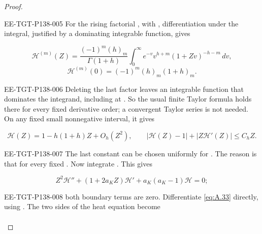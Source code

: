 \begin{proof}
\begin{EESegment}{EE-TGT-P138-005}
For the rising factorial , with
, differentiation under the integral, justified by a dominating integrable function,
gives
\end{EESegment}
\begin{equation}
 \mathcal H^{(m)}(Z)=\frac{(-1)^m(h)_m}{\Gamma(1+h)}
 \int_0^\infty e^{-v}v^{h+m}(1+Zv)^{-h-m}\,dv,
 \tag{A.34}\label{eq:A.34}
\end{equation}
\begin{equation}
 \mathcal H^{(m)}(0)=(-1)^m(h)_m(1+h)_m.
 \tag{A.35}\label{eq:A.35}
\end{equation}
\begin{EESegment}{EE-TGT-P138-006}
Deleting the last factor leaves an integrable function that dominates the integrand, including at
. So the usual finite Taylor formula holds there for every fixed derivative order; a
convergent Taylor series is not needed. On any fixed small nonnegative interval, it gives
\end{EESegment}
\begin{equation}
 \mathcal H(Z)=1-h(1+h)Z+O_h(Z^2),\qquad
 |\mathcal H(Z)-1|+|Z\mathcal H'(Z)|\leq C_hZ.
 \tag{A.36}\label{eq:A.36}
\end{equation}
\begin{EESegment}{EE-TGT-P138-007}
The last constant can be chosen uniformly for . The reason is that
 for every fixed . Now integrate
. This gives
\end{EESegment}
\begin{equation}
 Z^2\mathcal H''+(1+2a_KZ)\mathcal H'+a_K(a_K-1)\mathcal H=0;
 \tag{A.37}\label{eq:A.37}
\end{equation}
\begin{EESegment}{EE-TGT-P138-008}
both boundary terms are zero. Differentiate \eqref{eq:A.33} directly, using
. The two sides of the heat equation become
\end{EESegment}
\[
\begin{aligned}

\end{aligned}\]
\end{proof}
